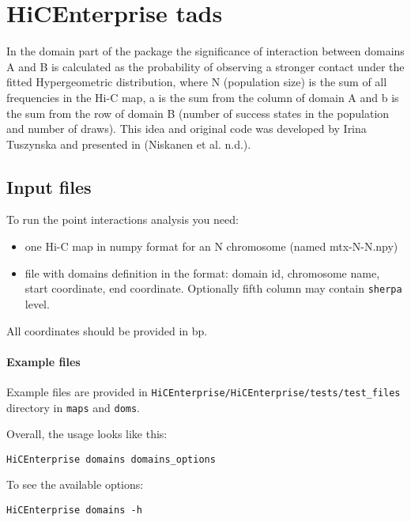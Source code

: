 \chapter{HiCEnterprise tads}
\label{domains}

In the domain part of the package the significance of interaction between domains A and B is calculated as the
probability of observing a stronger contact under the fitted Hypergeometric distribution, where N (population size) is
the sum of all frequencies in the Hi-C map, a is the sum from the column of domain A and b is the sum from the row of
domain B (number of success states in the population and number of draws). This idea and original code was developed
by Irina Tuszynska and presented in (Niskanen et al. n.d.).

\section{Input files}
\label{sec:input2}

To run the point interactions analysis you need:
\begin{itemize}
    \item one Hi-C map in numpy format for an N chromosome (named mtx-N-N.npy)
    \item file with domains definition in the format: domain id, chromosome name, start coordinate, end coordinate. Optionally fifth column may contain \lstinline{sherpa} level.
\end{itemize}

All coordinates should be provided in bp.

\subsubsection{Example files}
Example files are provided in \lstinline{HiCEnterprise/HiCEnterprise/tests/test_files} directory in \lstinline{maps} and \lstinline{doms}.

Overall, the usage looks like this:

\begin{lstlisting}
HiCEnterprise domains domains_options
\end{lstlisting}


To see the available options:
\begin{lstlisting}
HiCEnterprise domains -h
\end{lstlisting}


